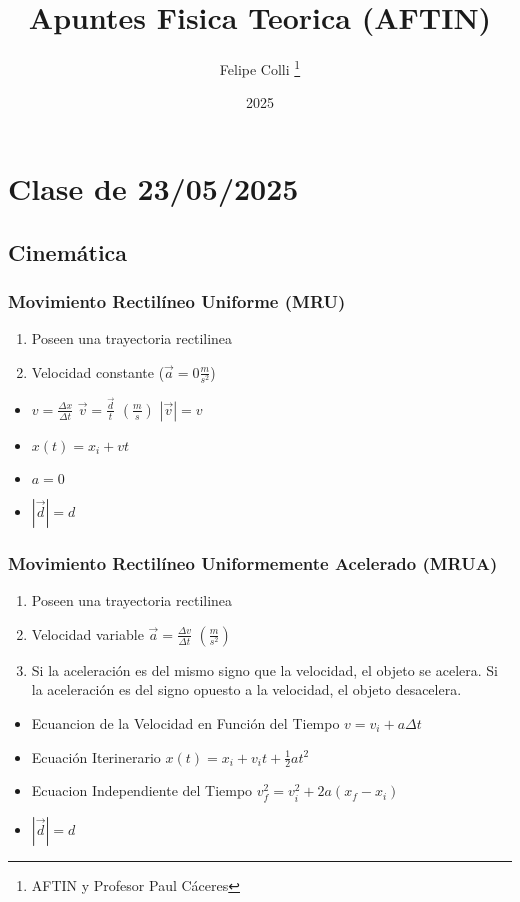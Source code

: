 \documentclass[11pt]{article}
\title{Apuntes Fisica Teorica (AFTIN)}
\author{Felipe Colli \thanks{AFTIN y Profesor Paul Cáceres}}
\date{2025}
\begin{document}
\maketitle
\tableofcontents
\newpage

\section{Clase de 23/05/2025}
\subsection{Cinemática}
\subsubsection{Movimiento Rectilíneo Uniforme (MRU)}
\begin{enumerate}
	\item Poseen una trayectoria rectilinea
	\item Velocidad constante ($\vec{a}=0\frac{m}{s^2}$)
\end{enumerate}
\begin{itemize}
	\item $v = \frac{\Delta x}{\Delta t}$ $\vec{v}=\frac{\vec{d}}{t}$ $(\frac{m}{s})$ $|\vec{v}|=v$
	\item $x(t) = x_i + vt$
	\item $a = 0$
	\item $|\vec{d}|=d$
\end{itemize}

\subsubsection{Movimiento Rectilíneo Uniformemente Acelerado (MRUA)}
\begin{enumerate}
	\item Poseen una trayectoria rectilinea
	\item Velocidad variable $\vec{a}=\frac{\Delta v}{\Delta t}$ $(\frac{m}{s^2})$
	\item Si la aceleración es del mismo signo que la velocidad, el objeto se acelera. Si la aceleración es del signo opuesto a la velocidad, el objeto desacelera.
\end{enumerate}
\begin{itemize}
	\item Ecuancion de la Velocidad en Función del Tiempo $v = v_i + a\Delta t$
	\item Ecuación Iterinerario $x(t) = x_i + v_i t + \frac{1}{2}at^2$
	\item Ecuacion Independiente del Tiempo $v_f^2 = v_i^2 + 2a(x_f-x_i)$
	\item $|\vec{d}|=d$
\end{itemize}
\end{document}
